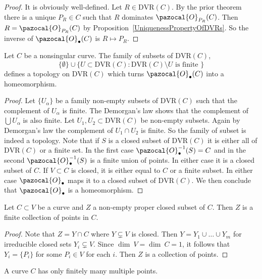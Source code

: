         \begin{proof}
            It is obviously well-defined. Let $R\in \mathrm{DVR}(C)$. By the prior theorem there is a unique $P_R\in C$ such that $R$ dominates $\pazocal{O}_{P_R}(C)$. Then $R=\pazocal{O}_{P_R}(C)$ by Proposition~\ref{UniquenessPropertyOfDVRs}. So the inverse of $\pazocal{O}_\bullet(C)$ is $R\mapsto P_R$.  
        \end{proof}
        \begin{proposition}
            Let $C$ be a nonsingular curve. The family of subsets of $\mathrm{DVR}(C)$,
            $$\{\emptyset\}\cup \{U\subset \mathrm{DVR}(C) : \mathrm{DVR}(C)\setminus U \text{ is finite }\}$$
            defines a topology on $\mathrm{DVR}(C)$ which turns $\pazocal{O}_\bullet(C)$ into a homeomorphism.
        \end{proposition}
        \begin{proof}
            Let $\{U_\alpha\}$ be a family non-empty subsets of $\mathrm{DVR}(C)$ such that the complement of $U_\alpha$ is finite. The Demorgan's law shows that the complement of $\bigcup U_\alpha$ is also finite. Let $U_1,U_2\subset \mathrm{DVR}(C)$ be non-empty subsets. Again by Demorgan's law the complement of $U_1\cap U_2$ is finite. So the family of subset is indeed a topology. Note that if $S$ is a closed subset of $\mathrm{DVR}(C)$ it is either all of $\mathrm{DVR}(C)$ or a finite set. In the first case $\pazocal{O}_\bullet^{-1}(S)=C$ and in the second $\pazocal{O}_\bullet^{-1}(S)$ is a finite union of points. In either case it is a closed subset of $C$. If $V\subset C$ is closed, it is either equal to $C$ or a finite subset. In either case $\pazocal{O}_\bullet$ maps it to a closed subset of $\mathrm{DVR}(C)$. We then conclude that $\pazocal{O}_\bullet$ is a homeomorphism. 
        \end{proof}
        \begin{lemma}
            Let $C\subset V$ be a curve and $Z$ a non-empty proper closed subset of $C$. Then $Z$ is a finite collection of points in $C$.  
        \end{lemma}
        \begin{proof}
            Note that $Z = Y\cap C$ where $Y\subsetneq V$ is closed. Then $Y = Y_1\cup \dots \cup Y_m$ for irreducible closed sets $Y_i\subsetneq V$. Since $\dim\ V = \dim\ C = 1$, it follows that $Y_i = \{P_i\}$ for some $P_i\in V$ for each $i$. Then $Z$ is a collection of points. 
        \end{proof}
        \begin{proposition}
            A curve $C$ has only finitely many multiple points.
        \end{proposition}
